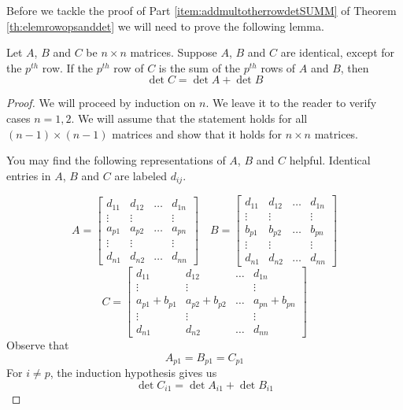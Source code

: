 \documentclass{ximera}
\begin{document}
Before we tackle the proof of Part \ref{item:addmultotherrowdetSUMM} of Theorem \ref{th:elemrowopsanddet} we will need to prove the following lemma.




\begin{lemma}\label{lemma:arowsumofbc}
Let $A$, $B$ and $C$ be $n\times n$ matrices. Suppose $A$, $B$ and $C$ are identical, except for the $p^{th}$ row.  If the $p^{th}$ row of $C$ is the sum of the $p^{th}$ rows of $A$ and $B$, then
$$\det{C}=\det{A}+\det{B}$$
\end{lemma}
\begin{proof}
We will proceed by induction on $n$.  We leave it to the reader to verify cases $n=1, 2$.  We will assume that the statement holds for all $(n-1)\times (n-1)$ matrices and show that it holds for $n\times n$ matrices.

You may find the following representations of $A$, $B$ and $C$ helpful.  Identical entries in $A$, $B$ and $C$ are labeled $d_{ij}$.

$$A=\begin{bmatrix} d_{11} & d_{12} & \dots  & d_{1n}  \\
   \vdots & \vdots &  & \vdots \\
   a_{p1} & a_{p2} &\dots  & a_{pn}  \\
   \vdots & \vdots &  & \vdots  \\
   d_{n1} & d_{n2} & \dots  & d_{nn}\end{bmatrix}\quad
   B=\begin{bmatrix} d_{11} & d_{12} & \dots  & d_{1n}  \\
   \vdots & \vdots &  & \vdots \\
   b_{p1} & b_{p2} &\dots  & b_{pn}  \\
   \vdots & \vdots &  & \vdots  \\
   d_{n1} & d_{n2} & \dots  & d_{nn}\end{bmatrix}$$
   $$C=\begin{bmatrix} d_{11} & d_{12} & \dots  & d_{1n}  \\
   \vdots & \vdots &  & \vdots \\
   a_{p1}+b_{p1} & a_{p2}+b_{p2} &\dots  & a_{pn}+b_{pn}  \\
   \vdots & \vdots &  & \vdots  \\
   d_{n1} & d_{n2} & \dots  & d_{nn}\end{bmatrix}$$
Observe that $$A_{p1}=B_{p1}=C_{p1}$$  For $i\neq p$, the induction hypothesis gives us
$$\det{C_{i1}}=\det{A_{i1}}+\det{B_{i1}}$$
   

\end{proof}
\end{document}

